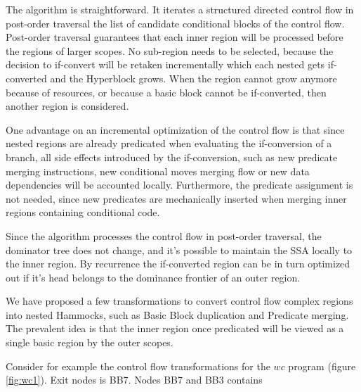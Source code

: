 The algorithm is straightforward. It iterates a structured directed control flow in post-order traversal the list of candidate conditional blocks of the control flow. Post-order traversal guarantees that each inner region will be processed before the regions of larger scopes. No sub-region needs to be selected, because the decision to if-convert will be retaken incrementally which each nested gets if-converted and the Hyperblock grows. When the region cannot grow anymore because of resources, or because a basic block cannot be if-converted, then another region is considered.

One advantage on an incremental optimization of the control flow is that since nested regions are already predicated when evaluating the if-conversion of a branch, all side effects introduced by the if-conversion, such as new predicate merging instructions, new conditional moves merging flow or new data dependencies will be accounted locally. Furthermore, the predicate assignment is not needed, since new predicates are mechanically inserted when merging inner regions containing conditional code.

Since the algorithm processes the control flow in post-order traversal, the dominator tree does not change, and it's possible to maintain the SSA locally to the inner region. By recurrence the if-converted region can be in turn optimized out if it's head belongs to the dominance frontier of an outer region.

We have proposed a few transformations to convert control flow complex regions into nested Hammocks, such as Basic Block duplication and Predicate merging. The prevalent idea is that the inner region once predicated will be viewed as a single basic region by the outer scopes.

Consider for example the control flow transformations for the $wc$ program (figure \ref{fig:wc1}). Exit nodes is BB7. Nodes BB7 and BB3 contains 

